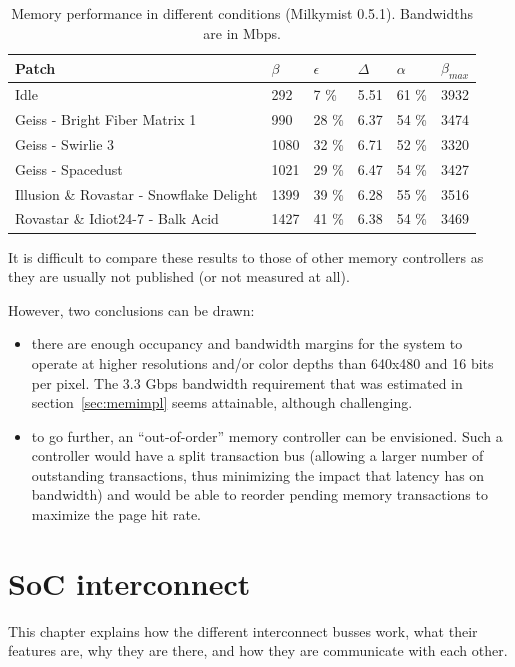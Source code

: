 \documentclass[a4paper,11pt]{kthesis}
\begin{document}
\begin{table}
\centering
\begin{tabular}{|l|l|l|l|l|l|}
\hline
\textbf{Patch} & $\beta$ & $\epsilon$ & $\Delta$ & $\alpha$ & $\beta_{max}$ \\
\hline
Idle & 292 & 7 \% & 5.51 & 61 \% & 3932 \\
\hline
Geiss - Bright Fiber Matrix 1 & 990 & 28 \% & 6.37 & 54 \% & 3474 \\
\hline
Geiss - Swirlie 3 & 1080 & 32 \% & 6.71 & 52 \% & 3320 \\
\hline
Geiss - Spacedust & 1021 & 29 \% & 6.47 & 54 \% & 3427 \\
\hline
Illusion \& Rovastar - Snowflake Delight & 1399 & 39 \% & 6.28 & 55 \% & 3516 \\
\hline
Rovastar \& Idiot24-7 - Balk Acid & 1427 & 41 \% & 6.38 & 54 \% & 3469 \\
\hline
\end{tabular}
\caption{Memory performance in different conditions (Milkymist 0.5.1). Bandwidths are in Mbps.}\label{tab:memperformance}
\end{table}

It is difficult to compare these results to those of other memory controllers as they are usually not published (or not measured at all).

However, two conclusions can be drawn:
\begin{itemize}
\item there are enough occupancy and bandwidth margins for the system to operate at higher resolutions and/or color depths than 640x480 and 16 bits per pixel. The 3.3 Gbps bandwidth requirement that was estimated in section~\ref{sec:memimpl} seems attainable, although challenging.
\item to go further, an ``out-of-order'' memory controller can be envisioned. Such a controller would have a split transaction bus (allowing a larger number of outstanding transactions, thus minimizing the impact that latency has on bandwidth) and would be able to reorder pending memory transactions to maximize the page hit rate.
\end{itemize}

\chapter{SoC interconnect}
\label{ch:intercon}
This chapter explains how the different interconnect busses work, what their features are, why they are there, and how they are communicate with each other.
\end{document}
